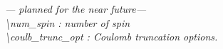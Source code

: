 \documentclass[letterpaper,12pt]{article}
\begin{document}
\begin{enumerate}
 \vspace{0.15in}
{\it 
--- planned for the near future---\\
\textbackslash{}num\_spin : number of spin\\
\textbackslash{}coulb\_trunc\_opt : Coulomb truncation options.

 }




   
\end{enumerate}

\newpage
\end{document}
